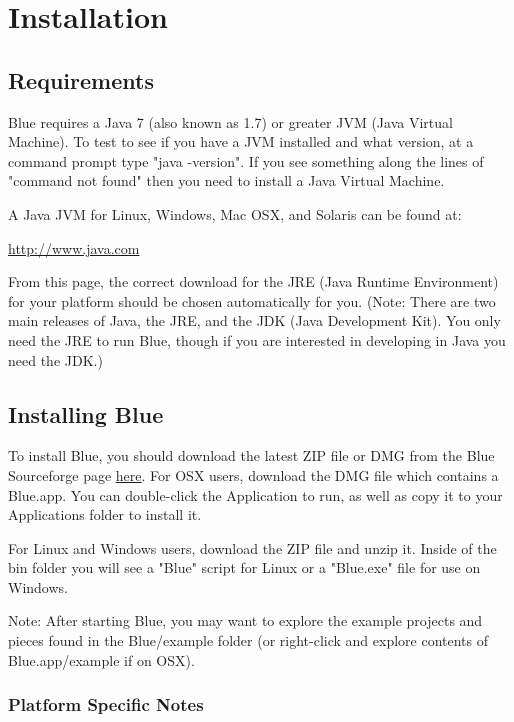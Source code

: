 \section{Installation}\label{installation}

\subsection{Requirements}\label{requirements}

Blue requires a Java 7 (also known as 1.7) or greater JVM (Java Virtual
Machine). To test to see if you have a JVM installed and what version,
at a command prompt type "java -version". If you see something along the
lines of "command not found" then you need to install a Java Virtual
Machine.

A Java JVM for Linux, Windows, Mac OSX, and Solaris can be found at:

\url{http://www.java.com}

From this page, the correct download for the JRE (Java Runtime
Environment) for your platform should be chosen automatically for you.
(Note: There are two main releases of Java, the JRE, and the JDK (Java
Development Kit). You only need the JRE to run Blue, though if you are
interested in developing in Java you need the JDK.)

\subsection{Installing Blue}\label{installingBlue}

To install Blue, you should download the latest ZIP file or DMG from the
Blue Sourceforge page
\href{http://www.sourceforge.net/projects/Bluemusic}{here}. For OSX
users, download the DMG file which contains a Blue.app. You can
double-click the Application to run, as well as copy it to your
Applications folder to install it.

For Linux and Windows users, download the ZIP file and unzip it. Inside
of the bin folder you will see a "Blue" script for Linux or a "Blue.exe"
file for use on Windows.

Note: After starting Blue, you may want to explore the example projects
and pieces found in the Blue/example folder (or right-click and explore
contents of Blue.app/example if on OSX).

\subsubsection{Platform Specific Notes}\label{platformNotes}


